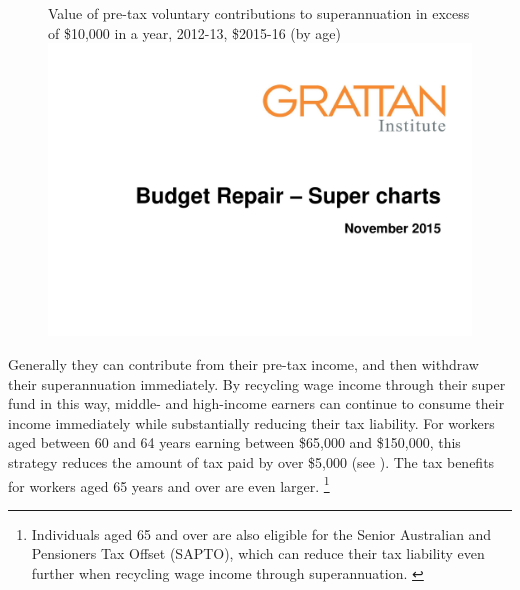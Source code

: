 \begin{figure}
%
{Value of pre-tax voluntary contributions to superannuation in excess of \$10,000 in a year, 2012-13, \$2015-16 (by age)}
\includegraphics[width=\columnwidth,page=25]{super-atlas/PPTX.pdf}
\end{figure}


Generally they can contribute from their pre-tax income, and then withdraw their superannuation immediately. By recycling wage income through their super fund in this way, middle- and high-income earners can continue to consume their income immediately while substantially reducing their tax liability. For workers aged between 60 and 64 years earning between \$65,000 and \$150,000, this strategy reduces the amount of tax paid by over \$5,000 (see ). The tax benefits for workers aged 65 years and over are even larger.%
\footnote{Individuals aged 65 and over are also eligible for the Senior Australian and Pensioners Tax Offset (SAPTO), which can reduce their tax liability even further when recycling wage income through superannuation. \textcite{ATO2015-Beneficiary-tax-offset-sapto-calculator}} 

